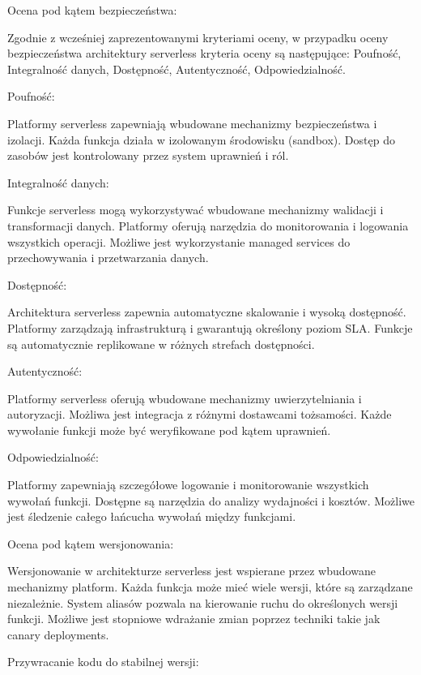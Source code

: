 \documentclass[runningheads,12pt]{llncs}
\begin{document}
Ocena pod kątem bezpieczeństwa:

Zgodnie z wcześniej zaprezentowanymi kryteriami oceny, w przypadku oceny bezpieczeństwa architektury serverless kryteria oceny są następujące: Poufność, Integralność danych, Dostępność, Autentyczność, Odpowiedzialność.

Poufność:

Platformy serverless zapewniają wbudowane mechanizmy bezpieczeństwa i izolacji. Każda funkcja działa w izolowanym środowisku (sandbox). Dostęp do zasobów jest kontrolowany przez system uprawnień i ról. ~\cite[p. 167]{roberts2018cloud}

Integralność danych:

Funkcje serverless mogą wykorzystywać wbudowane mechanizmy walidacji i transformacji danych. Platformy oferują narzędzia do monitorowania i logowania wszystkich operacji. Możliwe jest wykorzystanie managed services do przechowywania i przetwarzania danych. ~\cite[p. 189]{roberts2018cloud}

Dostępność:

Architektura serverless zapewnia automatyczne skalowanie i wysoką dostępność. Platformy zarządzają infrastrukturą i gwarantują określony poziom SLA. Funkcje są automatycznie replikowane w różnych strefach dostępności. ~\cite[p. 198]{roberts2018cloud}

Autentyczność:

Platformy serverless oferują wbudowane mechanizmy uwierzytelniania i autoryzacji. Możliwa jest integracja z różnymi dostawcami tożsamości. Każde wywołanie funkcji może być weryfikowane pod kątem uprawnień. ~\cite[p. 223]{roberts2018cloud}

Odpowiedzialność:

Platformy zapewniają szczegółowe logowanie i monitorowanie wszystkich wywołań funkcji. Dostępne są narzędzia do analizy wydajności i kosztów. Możliwe jest śledzenie całego łańcucha wywołań między funkcjami. ~\cite[p. 245]{roberts2018cloud}

Ocena pod kątem wersjonowania:

Wersjonowanie w architekturze serverless jest wspierane przez wbudowane mechanizmy platform. Każda funkcja może mieć wiele wersji, które są zarządzane niezależnie. System aliasów pozwala na kierowanie ruchu do określonych wersji funkcji. Możliwe jest stopniowe wdrażanie zmian poprzez techniki takie jak canary deployments. ~\cite[p. 267]{roberts2018cloud}

Przywracanie kodu do stabilnej wersji:
\end{document}
